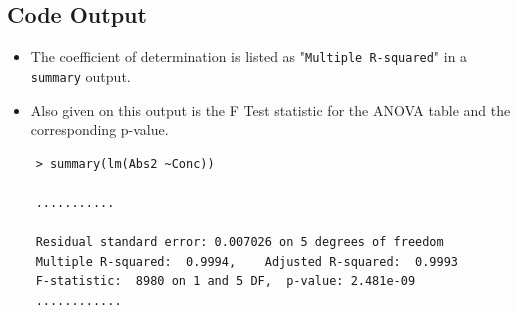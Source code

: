 \documentclass[a4paper,12pt]{article}
\begin{document}
\newpage
\subsection*{Code Output}
\begin{itemize}
	\item The coefficient of determination is listed as "\texttt{Multiple R-squared}" in a \texttt{summary} output. 
	\item Also given on this output is the F Test statistic for the ANOVA table and the corresponding p-value.
\end{itemize}
{
	\large
\begin{framed}
	\begin{verbatim}
	> summary(lm(Abs2 ~Conc))
	
	...........
	
	Residual standard error: 0.007026 on 5 degrees of freedom
	Multiple R-squared:  0.9994,    Adjusted R-squared:  0.9993 
	F-statistic:  8980 on 1 and 5 DF,  p-value: 2.481e-09
	............
	\end{verbatim}
\end{framed}
}
\end{document}

